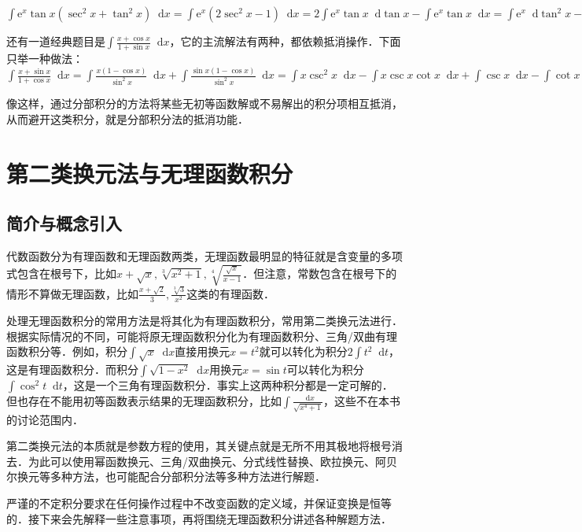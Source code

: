 \documentclass{ctexbook}
\newcommand{\e}{\mathrm{e}}
\newcommand*{\dif}{\mathop{}\!\mathrm{d}}
\begin{document}
$\int\e^{x}\tan{x}\left(\sec^{2}{x}+\tan^{2}{x}\right)\dif{x}=\int\e^{x}\left(2\sec^{2}{x}-1\right)\dif{x}=2\int\e^{x}\tan{x}\dif{\tan{x}}-\int\e^{x}\tan{x}\dif{x}=\int\e^{x}\dif{\tan^{2}{x}}-\int\e^{x}\tan{x}\dif{x}=\e^{x}\tan^{2}{x}-\int\e^{x}\tan^{2}{x}\dif{x}-\int\e^{x}\tan{x}\dif{x}=\e^{x}\tan^{2}{x}-\int\e^{x}\sec^{2}{x}\dif{x}+\int\e^{x}\dif{x}-\int\e^{x}\tan{x}\dif{x}=\e^{x}\tan^{2}{x}+\e^{x}-\int\tan{x}\,\mathrm{d}\e^{x}-\int\e^{x}\dif{\tan{x}}=\e^{x}\sec^{2}{x}-\e^{x}\tan{x}+C$\par
还有一道经典题目是$\int\frac{x+\cos{x}}{1+\sin{x}}\dif{x}$，它的主流解法有两种，都依赖抵消操作．下面只举一种做法：\\
$\int\frac{x+\sin{x}}{1+\cos{x}}\dif{x}=\int\frac{x\left(1-\cos{x}\right)}{\sin^{2}{x}}\dif{x}+\int\frac{\sin{x}\left(1-\cos{x}\right)}{\sin^{2}{x}}\dif{x}=\int x\csc^{2}{x}\dif{x}-\int x\csc{x}\cot{x}\dif{x}+\int\csc{x}\dif{x}-\int\cot{x}\dif{x}=-\int x\,\mathrm{d}\cot{x}+\int x\,\mathrm{d}\csc{x}+\int\csc{x}\dif{x}-\int\cot{x}\dif{x}=x\csc{x}-x\cot{x}+C$\par
像这样，通过分部积分的方法将某些无初等函数解或不易解出的积分项相互抵消，从而避开这类积分，就是分部积分法的抵消功能．\par
\chapter{第二类换元法与无理函数积分}
\section{简介与概念引入}
代数函数分为有理函数和无理函数两类，无理函数最明显的特征就是含变量的多项式包含在根号下，比如$x+\sqrt{x},\sqrt[3]{x^{2}+1},\sqrt[4]{\frac{\sqrt{x}}{x-1}}$．但注意，常数包含在根号下的情形不算做无理函数，比如$\frac{x+\sqrt{2}}{3},\frac{\sqrt[3]{3}}{x^{2}}$这类的有理函数．\par
处理无理函数积分的常用方法是将其化为有理函数积分，常用第二类换元法进行．根据实际情况的不同，可能将原无理函数积分化为有理函数积分、三角/双曲有理函数积分等．例如，积分$\int\sqrt{x}\dif{x}$直接用换元$x=t^{2}$就可以转化为积分$2\int t^{2}\dif{t}$，这是有理函数积分．而积分$\int\sqrt{1-x^{2}}\dif{x}$用换元$x=\sin{t}$可以转化为积分$\int\cos^{2}{t}\dif{t}$，这是一个三角有理函数积分．事实上这两种积分都是一定可解的．但也存在不能用初等函数表示结果的无理函数积分，比如$\int\frac{\dif{x}}{\sqrt{x^{4}+1}}$，这些不在本书的讨论范围内．\par
第二类换元法的本质就是参数方程的使用，其关键点就是无所不用其极地将根号消去．为此可以使用幂函数换元、三角/双曲换元、分式线性替换、欧拉换元、阿贝尔换元等多种方法，也可能配合分部积分法等多种方法进行解题．\par
严谨的不定积分要求在任何操作过程中不改变函数的定义域，并保证变换是恒等的．接下来会先解释一些注意事项，再将围绕无理函数积分讲述各种解题方法．\par
\end{document}
